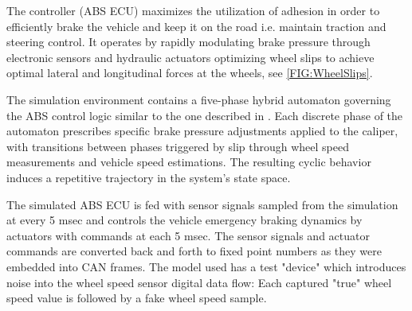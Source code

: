 \documentclass[a4paper, fleqn]{cas-dc}
\begin{document}
		
	The controller (ABS ECU) maximizes the utilization of adhesion in order to efficiently brake the vehicle and keep it on the road i.e. maintain traction and steering control. It operates by rapidly modulating brake pressure through electronic sensors and hydraulic actuators optimizing wheel slips to achieve optimal lateral and longitudinal forces at the wheels, see \autoref{FIG:WheelSlips}. 
	
	The simulation environment contains a five-phase hybrid automaton governing the ABS control logic similar to the one described in \cite{gerard2012improvements}. Each discrete phase of the automaton prescribes specific brake pressure adjustments applied to the caliper, with transitions between phases triggered by slip through wheel speed measurements and vehicle speed estimations. The resulting cyclic behavior induces a repetitive trajectory in the system’s state space.
	
	The simulated ABS ECU is fed with sensor signals sampled from the simulation at every 5 msec and controls the vehicle emergency braking dynamics by actuators with commands at each 5 msec. The sensor signals and actuator commands are converted back and forth to fixed point numbers as they were embedded into CAN frames. The model used has a test "device" which introduces noise into the wheel speed sensor digital data flow: Each captured "true" wheel speed value is followed by a fake wheel speed sample.
		
\end{document}
